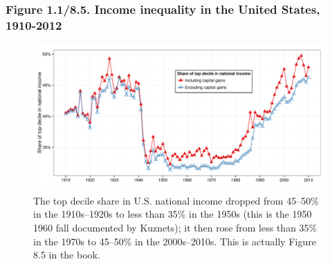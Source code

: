 \documentclass[t]{beamer}\usepackage[]{graphicx}\usepackage[]{color}
\newenvironment{knitrout}{}{} %
\begin{document}
\begin{frame}[label=Fig85,fragile]
\frametitle{Figure 1.1/8.5. Income inequality in the United States, 1910-2012}
\begin{figure}[t]
\begin{minipage}[b]{\textwidth}
\centering
\begin{knitrout}\footnotesize
{}\color{fgcolor}

{\centering \includegraphics[width=1\linewidth]{figures/color/Figure_8_5} 

}



\end{knitrout}
\caption{The top decile share in U.S. national income dropped from 45--50\% in the 1910s--1920s to less than 35\% in the 1950s (this is the
1950 1960 fall documented by Kuznets); it then rose from less than 35\% in the 1970s to 45--50\% in the 2000s--2010s. This is actually Figure 8.5 in the book.}
\end{minipage}
\end{figure}
\end{frame}
\end{document}
